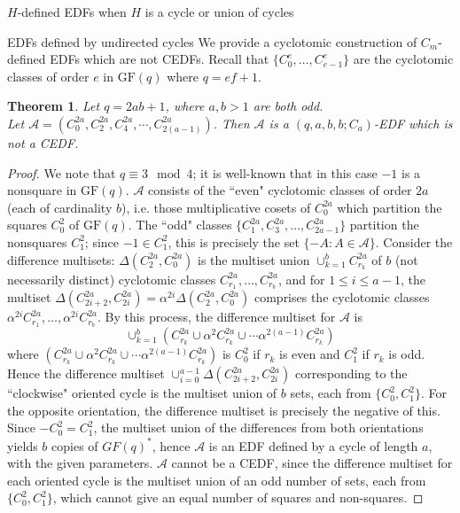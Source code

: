 \documentclass[12pt, a4paper]{article}
\newtheorem{theorem}{Theorem}[section]
\theoremstyle{definition}
\begin{document}
\begin{section}{$H$-defined EDFs when $H$ is a cycle or union of cycles}
\begin{subsection}{EDFs defined by undirected cycles}
We provide a cyclotomic construction of $C_m$-defined EDFs which are not CEDFs. Recall that $\{C_0^e, \ldots, C_{e-1}^e\}$ are  the cyclotomic classes of order $e$ in $\mathrm{GF}(q)$ where $q=ef+1$.

\begin{theorem}
Let $q=2ab+1$, where $a,b>1$ are both odd. \\
Let $\mathcal{A}=(C_0^{2a},C_2^{2a},C_4^{2a},\cdots, C_{2(a-1)}^{2a})$. Then $\mathcal{A}$ is a $(q,a,b,b; C_{a})$-EDF which is not a CEDF.
\end{theorem}
\begin{proof}
We note that $q \equiv 3 \mod 4$; it is well-known that in this case $-1$ is a nonsquare in $\mathrm{GF}(q)$. $\mathcal{A}$ consists of the ``even" cyclotomic classes of order $2a$ (each of cardinality $b$), i.e. those multiplicative cosets of $C_0^{2a}$ which partition the squares $C_0^2$ of $\mathrm{GF}(q)$. The ``odd" classes $\{C_1^{2a}, C_3^{2a}, \ldots, C_{2a-1}^{2a}\}$ partition the nonsquares $C_1^2$;  since $-1 \in C_1^2$, this is precisely the set $\{-A: A \in \mathcal{A}\}$. Consider the difference multisets:  $\Delta(C_2^{2a},C_0^{2a})$ is the multiset union $\cup_{k=1}^b C_{r_k}^{2a}$ of $b$ (not necessarily distinct) cyclotomic classes $C_{r_1}^{2a}, \ldots, C_{r_b}^{2a}$, and for $1 \leq i \leq a-1$, the multiset $\Delta(C_{2i+2}^{2a},C_{2i}^{2a})=\alpha^{2i}\Delta(C_2^{2a},C_0^{2a})$ comprises the cyclotomic classes $\alpha^{2i}C_{r_1}^{2a}, \ldots, \alpha^{2i}C_{r_b}^{2a}$.  By this process, the difference multiset for $\mathcal{A}$ is 
$$ \cup_{k=1}^b (C_{r_k}^{2a} \cup \alpha^2 C_{r_k}^{2a} \cup \cdots \alpha^{2(a-1)} C_{r_k}^{2a})$$
where $(C_{r_k}^{2a} \cup \alpha^2 C_{r_k}^{2a} \cup \cdots \alpha^{2(a-1)} C_{r_k}^{2a})$ is $C_0^2$ if $r_k$ is even and $C_1^2$ if $r_k$ is odd. Hence the difference multiset $\cup_{i=0}^{a-1} \Delta(C_{2i+2}^{2a}, C_{2i}^{2a})$ corresponding to the ``clockwise" oriented cycle is the multiset union of $b$ sets, each from $\{C_0^2,C_1^2\}$. For the opposite orientation, the difference multiset is precisely the negative of this. Since $-C_0^2=C_1^2$, the multiset union of the differences from both orientations yields $b$ copies of $GF(q)^*$, hence $\mathcal{A}$ is an EDF defined by a cycle of length $a$, with the given parameters.
$\mathcal{A}$ cannot be a CEDF, since the difference multiset for each oriented cycle is the multiset union of an odd number of sets, each from $\{C_0^2,C_1^2\}$, which cannot give an equal number of squares and non-squares.
\end{proof}


\end{subsection}
\end{section}
\end{document}
